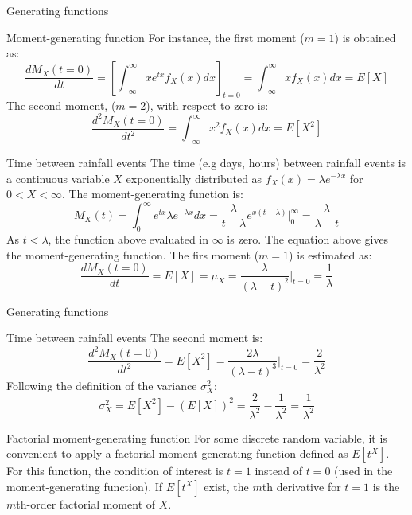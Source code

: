 \documentclass[8pt]{beamer}
\begin{document}
\begin{frame}{Generating functions}
    \begin{block}{Moment-generating function}
        For instance, the first moment ($m=1$) is obtained as:
\[
    \frac{d M_X (t=0)}{d t} = \left[ \int_{-\infty}^{\infty} x e^{tx} f_X (x) dx \right]_{t=0} = \int_{-\infty}^{\infty} x f_X (x) dx = E[X]
\]
The second moment, ($m=2$), with respect to zero is:
\[
    \frac{d^2 M_X (t=0)}{d t^2} = \int_{-\infty}^{\infty} x^2 f_X (x) dx = E[X^2]
\]
    \end{block}
    \begin{exampleblock}{Time between rainfall events}
        The time (e.g days, hours) between rainfall events is a continuous variable $X$ exponentially distributed as $f_X (x) = \lambda e^{-\lambda x}$ for $0 < X < \infty$. The moment-generating function is:
        \[
            M_X (t) = \int_{0}^{\infty} e^{tx} \lambda e^{-\lambda x} dx = \frac{\lambda}{t - \lambda} e^{x(t-\lambda)} \Big|_{0}^{\infty} = \frac{\lambda}{\lambda - t}
\]
As $t<\lambda$, the function above evaluated in $\infty$ is zero. The equation above gives the moment-generating function. The firs moment ($m=1$) is estimated as:
\[
    \frac{d M_X (t=0)}{d t} = E[X] = \mu_X = \frac{\lambda}{(\lambda - t)^2} \Big|_{t=0} = \frac{1}{\lambda}
\]

    \end{exampleblock}
\end{frame}

\begin{frame}{Generating functions}
    \begin{exampleblock}{Time between rainfall events}
The second moment is:
\[
    \frac{d^2 M_X (t=0)}{d t^2} = E[X^2] = \frac{2\lambda}{(\lambda - t)^3} \Big|_{t=0} = \frac{2}{\lambda^2}
\]
Following the definition of the  variance $\sigma_X^2$:
\[
    \sigma_X^2 = E[X^2] - \left( E[X] \right)^2 = \frac{2}{\lambda^2} - \frac{1}{\lambda^2} = \frac{1}{\lambda^2}
\]
    \end{exampleblock}

    \begin{block}{Factorial moment-generating function}
    For some discrete random variable, it is convenient to apply a \alert{factorial moment-generating function} defined as $E[t^X]$. For this function, the condition of interest is $t=1$ instead of $t=0$ (used in the moment-generating function). If $E[t^X]$ exist, the $m$th derivative for $t=1$ is the $m$th-order factorial moment of $X$. 
    \end{block}

\end{frame}
\end{document}
